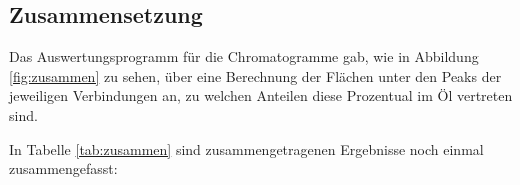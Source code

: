 \subsection*{Zusammensetzung}
Das Auswertungsprogramm für die Chromatogramme gab, wie in Abbildung \ref{fig:zusammen} zu sehen, über eine Berechnung der Flächen unter den Peaks der jeweiligen Verbindungen an, zu welchen Anteilen diese Prozentual im Öl vertreten sind.

In Tabelle \ref{tab:zusammen} sind zusammengetragenen Ergebnisse noch einmal zusammengefasst:

\begin{table}[h!]
	\renewcommand*{\arraystretch}{1.2}
	\centering
	\caption{Zusammengefasste Ergebnisse der Gaschromatografie und der \mbox{Massenspektroskopie}}
	\label{tab:zusammen}
\end{table}%
\FloatBarrier




